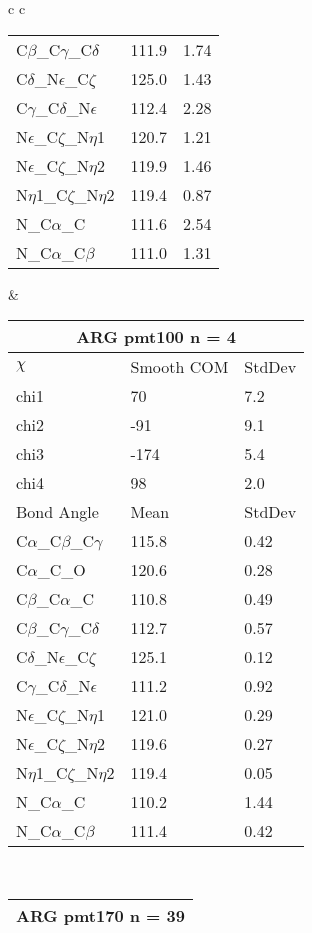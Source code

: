 \begin{longtable}{ c c }
\begin{tabular}{ l l l }
  C$\beta$\_C$\gamma$\_C$\delta$ & 111.9 & 1.74\\
  C$\delta$\_N$\epsilon$\_C$\zeta$ & 125.0 & 1.43\\
  C$\gamma$\_C$\delta$\_N$\epsilon$ & 112.4 & 2.28\\
  N$\epsilon$\_C$\zeta$\_N$\eta$1 & 120.7 & 1.21\\
  N$\epsilon$\_C$\zeta$\_N$\eta$2 & 119.9 & 1.46\\
  N$\eta$1\_C$\zeta$\_N$\eta$2 & 119.4 & 0.87\\
  N\_C$\alpha$\_C & 111.6 & 2.54\\
  N\_C$\alpha$\_C$\beta$ & 111.0 & 1.31\\
  \bottomrule
  \end{tabular}
  &
  \begin{tabular}{ l l l }
  \toprule
  \multicolumn{3}{c}{ARG \textbf{pmt100} n = 4} \\ \toprule
  $\chi$       & Smooth COM & StdDev \\ \midrule
  chi1 & 70 & 7.2 \\ 
  chi2 & -91 & 9.1 \\ 
  chi3 & -174 & 5.4 \\ 
  chi4 & 98 & 2.0 \\ \midrule
  Bond Angle   & Mean     & StdDev \\ \midrule
  C$\alpha$\_C$\beta$\_C$\gamma$ & 115.8 & 0.42\\
  C$\alpha$\_C\_O & 120.6 & 0.28\\
  C$\beta$\_C$\alpha$\_C & 110.8 & 0.49\\
  C$\beta$\_C$\gamma$\_C$\delta$ & 112.7 & 0.57\\
  C$\delta$\_N$\epsilon$\_C$\zeta$ & 125.1 & 0.12\\
  C$\gamma$\_C$\delta$\_N$\epsilon$ & 111.2 & 0.92\\
  N$\epsilon$\_C$\zeta$\_N$\eta$1 & 121.0 & 0.29\\
  N$\epsilon$\_C$\zeta$\_N$\eta$2 & 119.6 & 0.27\\
  N$\eta$1\_C$\zeta$\_N$\eta$2 & 119.4 & 0.05\\
  N\_C$\alpha$\_C & 110.2 & 1.44\\
  N\_C$\alpha$\_C$\beta$ & 111.4 & 0.42\\
  \bottomrule
  \end{tabular}
  \\
  \begin{tabular}{ l l l }
  \toprule
  \multicolumn{3}{c}{ARG \textbf{pmt170} n = 39} \\ \toprule

\end{tabular}
\end{longtable}
